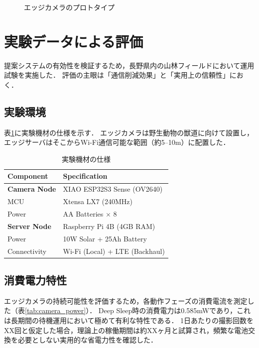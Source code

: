 \documentclass[technicalreport]{ieicej}
\begin{document}
\begin{figure}[tb]
  \centering
  \caption{エッジカメラのプロトタイプ}
  \label{fig:camera}
\end{figure}

\section{実験データによる評価}
提案システムの有効性を検証するため，長野県内の山林フィールドにおいて運用試験を実施した．
評価の主眼は「通信削減効果」と「実用上の信頼性」におく．

\subsection{実験環境}
表\ref{tab:components}に実験機材の仕様を示す．
エッジカメラは野生動物の獣道に向けて設置し，エッジサーバはそこからWi-Fi通信可能な範囲（約5--10m）に配置した．

\begin{table}[tb]
  \caption{実験機材の仕様}
  \label{tab:components}
  \centering
  \begin{tabular}{l|l}
    \hline
    Component            & Specification                  \\
    \hline \hline
    \textbf{Camera Node} & XIAO ESP32S3 Sense (OV2640)    \\
    MCU                  & Xtensa LX7 (240MHz)            \\
    Power                & AA Batteries $\times$ 8        \\
    \hline
    \textbf{Server Node} & Raspberry Pi 4B (4GB RAM)      \\
    Power                & 10W Solar + 25Ah Battery       \\
    Connectivity         & Wi-Fi (Local) + LTE (Backhaul) \\
    \hline
  \end{tabular}
\end{table}

\subsection{消費電力特性}
エッジカメラの持続可能性を評価するため，各動作フェーズの消費電流を測定した（表\ref{tab:camera_power}）．
Deep Sleep時の消費電力は0.585mWであり，これは長期間の待機運用において極めて有利な特性である．
1日あたりの撮影回数をXX回と仮定した場合，理論上の稼働期間は約XXヶ月と試算され，頻繁な電池交換を必要としない実用的な省電力性を確認した．
\end{document}
